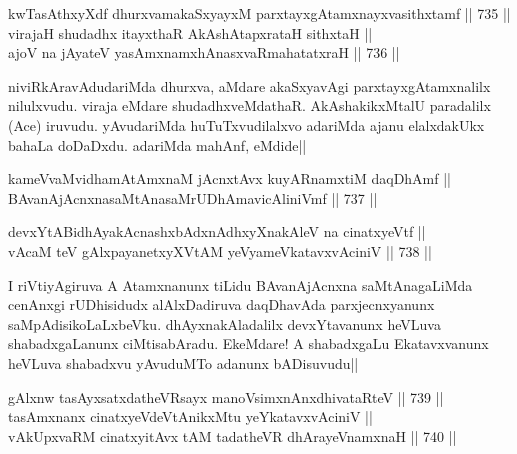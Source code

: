 
\begin{shl}
kwTasAthxyXdf dhurxvamakaSxyayxM parxtayxgAtamxnayxvasithxtamf ||  735 ||  \\
virajaH shudadhx itayxthaR AkAshAtapxrataH sithxtaH || \\
ajoV na jAyateV yasAmxnamxhAnasxvaRmahatatxraH ||  736 ||  
\end{shl}

\begin{artha} 
niviRkAravAdudariMda dhurxva, aMdare akaSxyavAgi parxtayxgAtamxnalilx 
nilulxvudu. viraja eMdare shudadhxveMdathaR. AkAshakikxMtalU 
paradalilx (Ace) iruvudu. yAvudariMda huTuTxvudilalxvo adariMda ajanu 
elalxdakUkx bahaLa doDaDxdu. adariMda mahAnf, eMdide||
\end{artha}


\begin{shl}
kameVvaMvidhamAtAmxnaM jAcnxtAvx kuyARnamxtiM daqDhAmf || \\
BAvanAjAcnxnasaMtAnasaMrUDhAmavicAliniVmf ||  737 ||  
\end{shl}
				
\begin{shl}
devxYtABidhAyakAcnashxbAdxnAdhxyXnakAleV na cinatxyeVtf || \\
vAcaM teV gAlxpayanetxyXVtAM yeVyameVkatavxvAciniV ||  738 ||  
\end{shl}

\begin{artha} 
I riVtiyAgiruva A Atamxnanunx tiLidu BAvanAjAcnxna saMtAnagaLiMda 
cenAnxgi rUDhisidudx alAlxDadiruva daqDhavAda parxjecnxyanunx 
saMpAdisikoLaLxbeVku. dhAyxnakAladalilx devxYtavanunx heVLuva 
shabadxgaLanunx ciMtisabAradu. EkeMdare! A shabadxgaLu Ekatavxvanunx 
heVLuva shabadxvu yAvuduMTo adanunx bADisuvudu||
\end{artha}


\begin{shl}
gAlxnw tasAyxsatxdatheVR\s sayx manoV\s simxnAnxdhivataRteV ||  739 || \\
tasAmxnanx cinatxyeVdeVtAnikxMtu yeYkatavxvAciniV || \\
vAkUpxvaRM cinatxyitAvx tAM tadatheVR dhArayeVnamxnaH ||  740 ||  
\end{shl}

